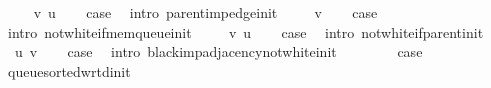 \begin{isabellebody}
\isanewline
{}\isamarkupfalse%
\isanewline
\ \ \isamarkupfalse%
\ {\isacharparenleft}{\kern0pt}{}\ v\ u{\isacharparenright}{\kern0pt}\isanewline
\ \ \isamarkupfalse%
\ {\isacharquery}{\kern0pt}case\ \isamarkupfalse%
\ {\isacharparenleft}{\kern0pt}intro\ parent{\isacharunderscore}{\kern0pt}imp{\isacharunderscore}{\kern0pt}edge{\isacharunderscore}{\kern0pt}init{\isacharparenright}{\kern0pt}\isanewline
{}\isamarkupfalse%
\isanewline
\ \ \isamarkupfalse%
\ {\isacharparenleft}{\kern0pt}{}\ v{\isacharparenright}{\kern0pt}\isanewline
\ \ \isamarkupfalse%
\ {\isacharquery}{\kern0pt}case\ \isamarkupfalse%
\ {\isacharparenleft}{\kern0pt}intro\ not{\isacharunderscore}{\kern0pt}white{\isacharunderscore}{\kern0pt}if{\isacharunderscore}{\kern0pt}mem{\isacharunderscore}{\kern0pt}queue{\isacharunderscore}{\kern0pt}init{\isacharparenright}{\kern0pt}\isanewline
{}\isamarkupfalse%
\isanewline
\ \ \isamarkupfalse%
\ {\isacharparenleft}{\kern0pt}{}\ v\ u{\isacharparenright}{\kern0pt}\isanewline
\ \ \isamarkupfalse%
\ {\isacharquery}{\kern0pt}case\ \isamarkupfalse%
\ {\isacharparenleft}{\kern0pt}intro\ not{\isacharunderscore}{\kern0pt}white{\isacharunderscore}{\kern0pt}if{\isacharunderscore}{\kern0pt}parent{\isacharunderscore}{\kern0pt}init{\isacharparenright}{\kern0pt}\isanewline
{}\isamarkupfalse%
\isanewline
\ \ \isamarkupfalse%
\ {\isacharparenleft}{\kern0pt}{}\ u\ v{\isacharparenright}{\kern0pt}\isanewline
\ \ \isamarkupfalse%
\ {\isacharquery}{\kern0pt}case\ \isamarkupfalse%
\ {\isacharparenleft}{\kern0pt}intro\ black{\isacharunderscore}{\kern0pt}imp{\isacharunderscore}{\kern0pt}adjacency{\isacharunderscore}{\kern0pt}not{\isacharunderscore}{\kern0pt}white{\isacharunderscore}{\kern0pt}init{\isacharparenright}{\kern0pt}\isanewline
{}\isamarkupfalse%
\isanewline
\ \ \isamarkupfalse%
\ {}\isanewline
\ \ \isamarkupfalse%
\ {\isacharquery}{\kern0pt}case\ \isamarkupfalse%
\ queue{\isacharunderscore}{\kern0pt}sorted{\isacharunderscore}{\kern0pt}wrt{\isacharunderscore}{\kern0pt}d{\isacharunderscore}{\kern0pt}init\ \isacommand{{\isachardot}{\kern0pt}}\isamarkupfalse%
\isanewline
{}\isamarkupfalse%
\isanewline
\ \ \isamarkupfalse%
\ {}{}\isanewline
\ \ \isamarkupfalse%

\end{isabellebody}
